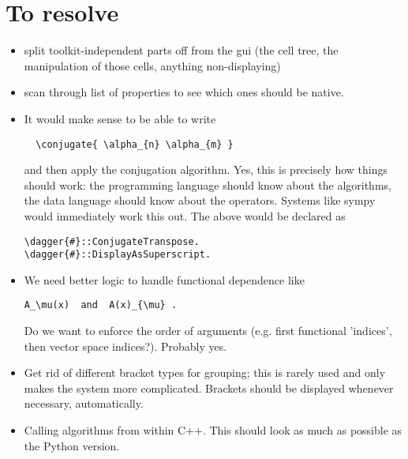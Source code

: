 \documentclass[11pt]{article}
\begin{document}


% 
% 
% 
% 

\section{To resolve}

\begin{itemize}
\item  split toolkit-independent parts off from the gui (the cell tree,
  the manipulation of those cells, anything non-displaying)
\item scan through list of properties to see which ones should be
native.

\item It would make sense to be able to write
\begin{lstlisting}
  \conjugate{ \alpha_{n} \alpha_{m} }
\end{lstlisting}
and then apply the conjugation algorithm. Yes, this is precisely how
things should work: the programming language should know about the
algorithms, the data language should know about the operators. Systems
like sympy would immediately work this out. The above would be
declared as
\begin{lstlisting}
\dagger{#}::ConjugateTranspose.
\dagger{#}::DisplayAsSuperscript.
\end{lstlisting}
\item We need better logic to handle functional dependence like
\begin{lstlisting}
A_\mu(x)  and  A(x)_{\mu} .
\end{lstlisting}
Do we want to enforce the order of arguments (e.g. first functional
'indices', then vector space indices?).  Probably yes.

\item Get rid of different bracket types for grouping; this is rarely used and only
makes the system more complicated. Brackets should be displayed
whenever necessary, automatically. 

\item Calling algorithms from within C++. This should look as much as possible
as the Python version.


\end{itemize}
\end{document}
